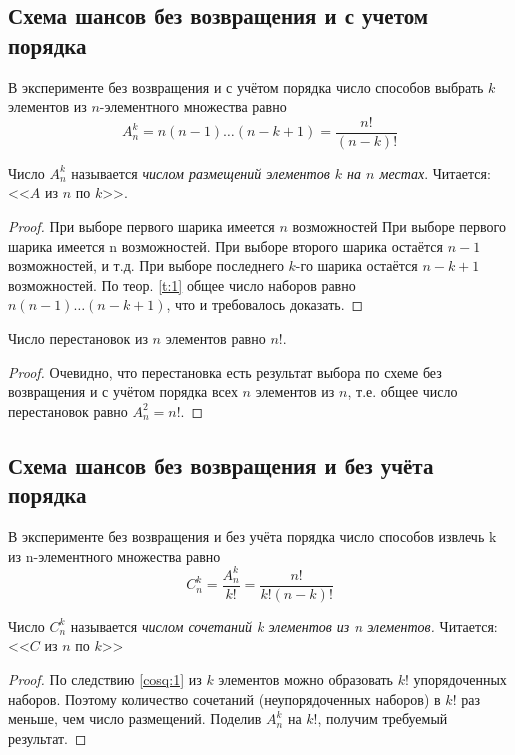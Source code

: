 \subsection{Схема шансов без возвращения и с учетом порядка}
\begin{theorem}
В эксперименте без возвращения и с учётом порядка число способов выбрать $k$ элементов из $n$-элементного множества равно
\begin{equation}
	A_n^k=n(n-1)\dots(n-k+1)=\frac{n!}{(n-k)!}
\end{equation}
\end{theorem}
Число $A_n^k$ называется \textit{числом размещений элементов $k$ на $n$ местах}. Читается: <<$A$ из $n$ по $k$>>.  

\begin{proof}
При выборе первого шарика имеется $n$ возможностей При выборе первого шарика имеется n возможностей. При выборе второго шарика остаётся $n−1$ возможностей, и т.д. При выборе последнего $k$-го шарика остаётся $n − k + 1$ возможностей. По теор. \ref{t:1} общее
число наборов равно $n(n−1)\dots(n−k +1)$, что и требовалось доказать.
\end{proof}

\begin{consq}
\label{cosq:1}
Число перестановок из $n$ элементов равно $n!$.
\end{consq}

\begin{proof}
Очевидно, что перестановка есть результат выбора по схеме без возвращения и с учётом порядка всех $n$ элементов из $n$, т.е. общее
число перестановок равно $A_n^2=n!$.
\end{proof}
\subsection{Схема шансов без возвращения и без учёта порядка}
\begin{theorem}
\label{t:2}
В эксперименте без возвращения и без учёта порядка число
способов извлечь k из n-элементного множества равно
\begin{equation}
	C_n^k=\frac{A_n^k}{k!}=\frac{n!}{k!(n-k)!}
\end{equation}
	
Число $C_n^k$ называется \textit{числом сочетаний k элементов из n элементов.}
Читается: <<$C$ из $n$ по $k$>>
\end{theorem}

\begin{proof}
По следствию \ref{cosq:1} из $k$ элементов можно образовать $k!$ упорядоченных наборов. Поэтому количество сочетаний 
(неупорядоченных наборов)
в $k!$ раз меньше, чем число размещений. Поделив $A^k_
n$ на $k!$, получим требуемый результат.
\end{proof}

